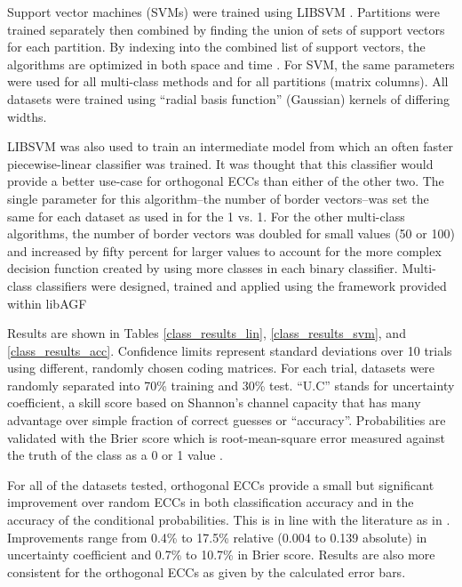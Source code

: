 Support vector machines (SVMs) were trained using
LIBSVM \citep{Chang_Lin2011}.
Partitions were trained separately then combined by finding the union of
sets of support vectors for each partition.
By indexing into the combined list of support vectors, the algorithms are
optimized in both space and time \citep{Chang_Lin2011}.
For SVM, the same parameters were used for all multi-class methods and
for all partitions (matrix columns).
All datasets were trained using  ``radial basis function'' (Gaussian)
kernels of differing widths.

LIBSVM was also used to train an intermediate model from which an often faster 
piecewise-linear classifier \citep{Mills2018} was trained.
It was thought that this classifier would provide a better use-case for orthogonal
ECCs than either of the other two.
The single parameter for this algorithm--the number of border vectors--was set 
the same for each dataset as used in \citet{Mills2018} for the 1 vs. 1. 
For the other multi-class algorithms, the number of border vectors
was doubled for small values (50 or 100) and increased by fifty percent
for larger values to account for the more complex decision function
created by using more classes in each binary classifier.
Multi-class classifiers were designed, trained and applied using the
framework provided within libAGF \citep{Mills2011,Mills2018,Mills2018a}

Results are shown in Tables \ref{class_results_lin}, \ref{class_results_svm},
and \ref{class_results_acc}.
Confidence limits represent standard deviations over 10 trials using
different, randomly chosen coding matrices.
For each trial, datasets were randomly separated into 70\% training and 30\%
test.
``U.C'' stands for uncertainty
coefficient, a skill score based on Shannon's channel capacity
\citep{Shannon,Press_etal1992,Mills2011} that has many advantage over simple
fraction of correct guesses or ``accuracy''.
Probabilities are validated with the Brier score 
which is root-mean-square
error measured against the truth of the class as a 0 or 1 value
\citep{Brier1950,Jolliffe_Stephenson2003}.

For all of the datasets tested, orthogonal ECCs provide a small but
significant improvement over random ECCs in both classification
accuracy and in the accuracy of the conditional probabilities.
This is in line with the literature as in \citet{Dietterich_Bakiri1995,Windeatt_Ghaderi2002}.
Improvements range from 0.4\% to 17.5\% relative (0.004 to 0.139 absolute) in 
uncertainty coefficient
and 0.7\% to 10.7\% in Brier score.
Results are also more consistent for the orthogonal ECCs as given by the
calculated error bars.

